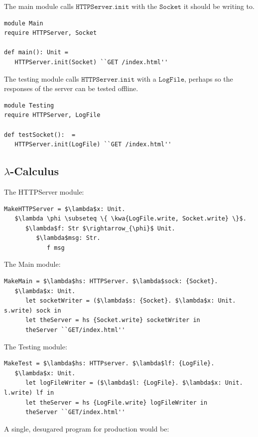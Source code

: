 \documentclass{llncs}
\newcommand{\keywadj}[1]{\mathtt{#1}}
\newcommand{\kwa}[1]{\keywadj{ #1 }}
\begin{document}
\noindent
The main module calls $\kwa{HTTPServer.init}$ with the $\kwa{Socket}$ it should be writing to.

\begin{lstlisting}
module Main
require HTTPServer, Socket

def main(): Unit =
   HTTPServer.init(Socket) ``GET /index.html''
\end{lstlisting}

\noindent
The testing module calls $\kwa{HTTPServer.init}$ with a $\kwa{LogFile}$, perhaps so the responses of the server can be tested offline.

\begin{lstlisting}
module Testing
require HTTPServer, LogFile

def testSocket():  =
   HTTPServer.init(LogFile) ``GET /index.html''
\end{lstlisting}


\subsection*{$\lambda$-Calculus}

\noindent
The HTTPServer module:
\begin{lstlisting}
MakeHTTPServer = $\lambda$x: Unit.
   $\lambda \phi \subseteq \{ \kwa{LogFile.write, Socket.write} \}$.
      $\lambda$f: Str $\rightarrow_{\phi}$ Unit.
         $\lambda$msg: Str.
            f msg
\end{lstlisting}

\noindent
The Main module:

\begin{lstlisting}
MakeMain = $\lambda$hs: HTTPServer. $\lambda$sock: {Socket}.
   $\lambda$x: Unit.
      let socketWriter = ($\lambda$s: {Socket}. $\lambda$x: Unit. s.write) sock in
      let theServer = hs {Socket.write} socketWriter in
      theServer ``GET/index.html''
\end{lstlisting}

\noindent
The Testing module:

\begin{lstlisting}
MakeTest = $\lambda$hs: HTTPserver. $\lambda$lf: {LogFile}.
   $\lambda$x: Unit.
      let logFileWriter = ($\lambda$l: {LogFile}. $\lambda$x: Unit. l.write) lf in
      let theServer = hs {LogFile.write} logFileWriter in
      theServer ``GET/index.html''
\end{lstlisting}

\noindent
A single, desugared program for production would be:
\end{document}
